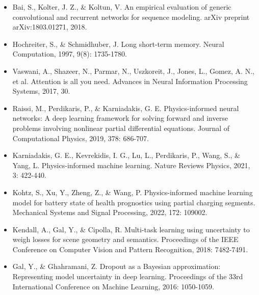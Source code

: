 \documentclass[12pt, a4paper]{ctexart}
\begin{document}
\begin{itemize}
  \item  Bai, S., Kolter, J. Z., \& Koltun, V. An empirical evaluation of generic convolutional and recurrent networks for sequence modeling. arXiv preprint arXiv:1803.01271, 2018.
\end{itemize}
\begin{itemize}
  \item  Hochreiter, S., \& Schmidhuber, J. Long short-term memory. Neural Computation, 1997, 9(8): 1735-1780.
\end{itemize}
\begin{itemize}
  \item  Vaswani, A., Shazeer, N., Parmar, N., Uszkoreit, J., Jones, L., Gomez, A. N., et al. Attention is all you need. Advances in Neural Information Processing Systems, 2017, 30.
\end{itemize}
\begin{itemize}
  \item  Raissi, M., Perdikaris, P., \& Karniadakis, G. E. Physics-informed neural networks: A deep learning framework for solving forward and inverse problems involving nonlinear partial differential equations. Journal of Computational Physics, 2019, 378: 686-707.
\end{itemize}
\begin{itemize}
  \item  Karniadakis, G. E., Kevrekidis, I. G., Lu, L., Perdikaris, P., Wang, S., \& Yang, L. Physics-informed machine learning. Nature Reviews Physics, 2021, 3: 422-440.
\end{itemize}
\begin{itemize}
  \item  Kohtz, S., Xu, Y., Zheng, Z., \& Wang, P. Physics-informed machine learning model for battery state of health prognostics using partial charging segments. Mechanical Systems and Signal Processing, 2022, 172: 109002.
\end{itemize}
\begin{itemize}
  \item  Kendall, A., Gal, Y., \& Cipolla, R. Multi-task learning using uncertainty to weigh losses for scene geometry and semantics. Proceedings of the IEEE Conference on Computer Vision and Pattern Recognition, 2018: 7482-7491.
\end{itemize}
\begin{itemize}
  \item  Gal, Y., \& Ghahramani, Z. Dropout as a Bayesian approximation: Representing model uncertainty in deep learning. Proceedings of the 33rd International Conference on Machine Learning, 2016: 1050-1059.
\end{itemize}
\end{document}
